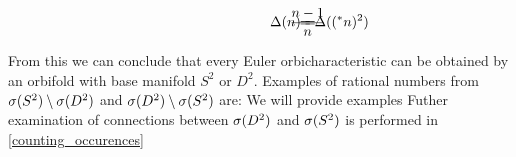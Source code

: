\begin{align}
\hspace{3cm}\Delta(n) =& \hspace{-1cm} &\frac{n-1}{n}& \hspace{-1cm} 
&= \Delta((^\ast n)^2)\label{third_reduction}
\end{align}


From this we can conclude that every Euler orbicharacteristic can be obtained 
by an orbifold with base manifold $S^2$ or $D^2$. 
Examples of rational numbers from ${{\sigma}(S^2)} \setminus {{\sigma}(D^2)}$ and ${{\sigma}(D^2)} \setminus {{\sigma}(S^2)}$ are:
We will provide examples 
Futher examination of connections between ${{\sigma}(D^2)}$ and ${{\sigma}(S^2)}$ is performed in 
\ref{counting_occurences}





